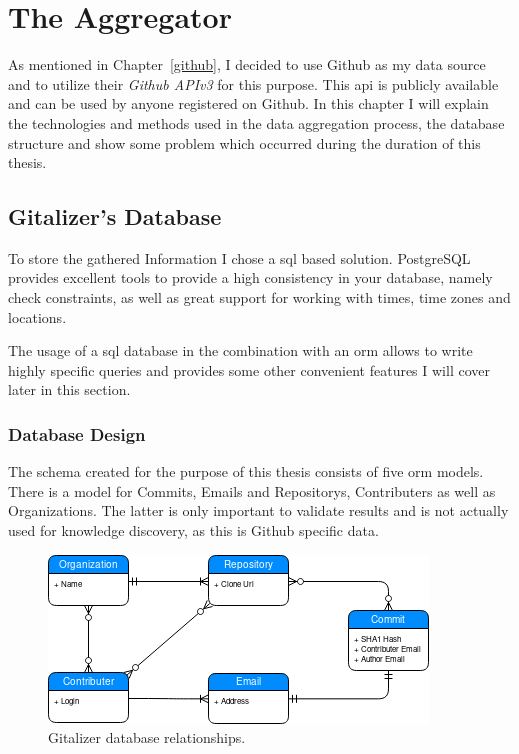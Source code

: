 \chapter{The Aggregator}\label{aggregator}
As mentioned in Chapter~\ref{github}, I decided to use Github as my data source and to utilize their \emph{Github APIv3} for this purpose.
This \ac{api} is publicly available and can be used by anyone registered on Github.
In this chapter I will explain the technologies and methods used in the data aggregation process, the database structure and show some problem which occurred during the duration of this thesis.


\section{Gitalizer's Database}\label{data-structure}
To store the gathered Information I chose a \ac{sql} based solution.
PostgreSQL provides excellent tools to provide a high consistency in your database, namely check constraints, as well as great support for working with times, time zones and locations.

The usage of a \ac{sql} database in the combination with an \ac{orm} allows to write highly specific queries and provides some other convenient features I will cover later in this section.

\subsection{Database Design}
The schema created for the purpose of this thesis consists of five \ac{orm} models.
There is a model for Commits, Emails and Repositorys, Contributers as well as Organizations.
The latter is only important to validate results and is not actually used for knowledge discovery, as this is Github specific data.

\begin{figure}[H]
\includegraphics[scale=0.27]{./graphs/gitalizer-data-structure}
\centering
\caption{Gitalizer database relationships.}\label{fig:gitalizer-relationship}
\end{figure}

